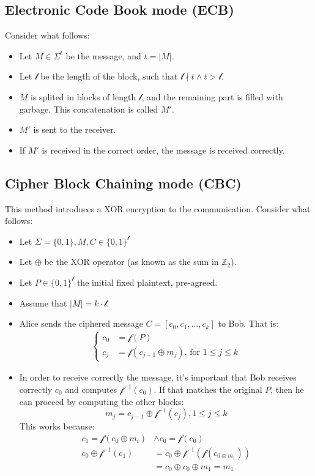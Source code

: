 \subsection{Electronic Code Book mode (ECB)}
Consider what follows:
\begin{itemize}
    \item Let $M \in \Sigma^{t}$ be the message, and $t = |M|$.
    \item Let $\mathcal{l}$ be the length of the block, such that $\mathcal{l} \nmid t \land t > \mathcal{l}$.
    \item $M$ is splited in blocks of length $\mathcal{l}$, and the remaining part is filled with garbage. This concatenation is called $M'$.
    \item $M'$ is sent to the receiver.
    \item If $M'$ is received in the correct order, the  message is received correctly.
\end{itemize}
\subsection{Cipher Block Chaining mode (CBC)}
This method introduces a XOR encryption to the communication. \newline
Consider what follows:
\begin{itemize}
    \item Let $\Sigma = \{0,1\}, M, C \in \{0,1\}^{\mathcal{l}}$
    \item Let $\oplus$ be the XOR operator (as known as the sum in $\mathbb{Z}_{2}$).
    \item Let $P \in \{0,1\}^{\mathcal{l}}$ the initial fixed plaintext, pre-agreed.
    \item Assume that $|M| = k \cdot \mathcal{l}$.
    \item Alice sends the ciphered message $C = [c_{0}, c_{1}, \dots, c_{k}]$ to Bob. That is:
    \begin{align*}
        \begin{cases}
          c_{0} & = \mathcal{f}(P)\\
          c_{j} & = \mathcal{f}(c_{j-1} \oplus m_{j}) \text{, for } 1 \leq j \leq k
        \end{cases}
    \end{align*}
    \item In order to receive correctly the message, it's important that Bob receives correctly $c_{0}$ and computes $\mathcal{f}^{-1}(c_{0})$. If that matches the original $P$, then he can proceed by computing the other blocks:
    \[m_{j} = c_{j-1} \oplus \mathcal{f}^{-1}(c_{j}), 1 \leq j \leq k\]
    This works because:
    \begin{align*}
        c_{1} = \mathcal{f}(c_{0} \oplus m_{i}) & \land c_{0} = \mathcal{f}(c_{0}) \\
        c_{0} \oplus \mathcal{f}^{-1}(c_{1}) & = c_{0} \oplus \mathcal{f}^{-1}(\mathcal{f}(c_{0 \oplus m_{1}})) \\
        & = c_{0} \oplus c_{0} \oplus m_{1} = m_{1}
    \end{align*}
\end{itemize}
